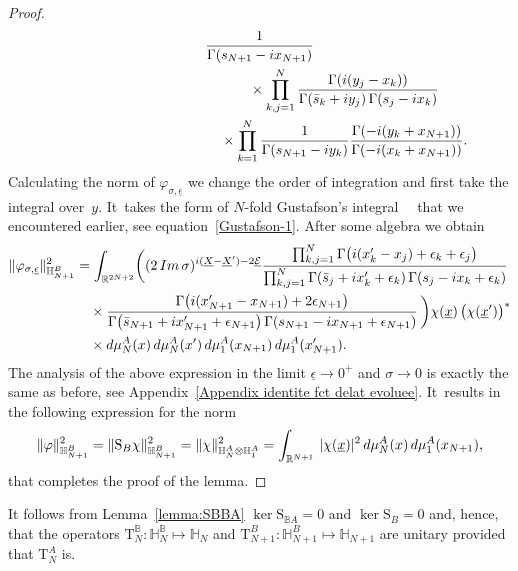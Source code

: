 \documentclass[11pt]{article}
\numberwithin{equation}{section}
\numberwithin{equation}{section}
\begin{document}
\begin{proof}
\begin{gather*}
\frac1{\Gamma(s_{N+1}-{\rm i}x_{N+1})}
\\ \hphantom{\big(\Psi^N_{p,\underline y},\Phi^N_{{\sigma,x}}\otimes\Phi^1_{\sigma,x_{N+1}}\big)_{\mathbb H_N} =}
{}\times \prod_{k,j=1}^N\frac{\Gamma({\rm i}(y_j-x_k)
)}{\Gamma(\bar s_k+{\rm i}y_j)\,\Gamma(s_j-{\rm i}x_k)}
\\ \hphantom{\big(\Psi^N_{p,\underline y},\Phi^N_{{\sigma,x}}\otimes\Phi^1_{\sigma,x_{N+1}}\big)_{\mathbb H_N} =}
{}\times \prod_{k=1}^N\frac1{\Gamma(s_{N+1}-{\rm i}y_k)} \frac{ \Gamma(-{\rm i}(y_k+x_{N+1}) )}{\Gamma(-{\rm i}(x_k+x_{N+1}))}.
\end{gather*}
Calculating the norm of $\varphi_{\sigma,\underline \epsilon}$ we change the order of integration and first take the integral over~$y$. It~takes the form of $N$-fold Gustafson's integral~~\cite[Theorem 5.1]{MR1139492} that we encountered earlier, see equation~\eqref{Gustafson-1}.
After some algebra we obtain
\begin{align*}
\|\varphi_{\sigma,\underline \epsilon}\|^2_{\mathbb H_{N+1}^B} & = \int_{\mathbb R^{2N+2}}
\biggl((2\mathop{\rm Im}\sigma)^{{\rm i}(\underline X-\underline X')-2\underline{\mathcal E}}
\frac{\prod_{k,j=1}^{N} \Gamma\big({\rm i}(x'_k-x_j)+\epsilon_k+\epsilon_j\big)}{\prod_{k,j=1}^{N}
\Gamma( \bar s_j+{\rm i}x'_k+\epsilon_k)\,\Gamma( s_j-{\rm i}x_k+\epsilon_k)}
\\
&\quad
\times \frac{\Gamma\big({\rm i}(x'_{N+1}-x_{N+1})+2\epsilon_{N+1}\big)}{
\Gamma\big(\bar s_{N+1}+{\rm i}x'_{N+1}+\epsilon_{N+1}\big)\,\Gamma( s_{N+1}-{\rm i}x_{N+1}+\epsilon_{N+1})}\,\biggr)\chi(\underline x)\, \big(\chi(\underline x')\big)^*
\\
&\quad \times {\rm d}\mu_{N}^A(x)\,{\rm d}\mu_{N}^A(x')\, {\rm d}\mu_{1}^A(x_{N+1})\,{\rm d}\mu_{1}^A(x'_{N+1}).
\end{align*}
The analysis of the above expression in the limit $\underline \epsilon\to 0^+$ and $\sigma \to0$ is exactly the same as before, see
Appendix~\ref{Appendix identite fct delat evoluee}. It~results in the following expression for the norm
\begin{gather*}
\|\varphi\|^2_{\mathbb H_{N+1}^B} =\|\mathrm S_B\chi\|^2_{\mathbb H_{N+1}^B} =\|\chi\|^2_{\mathbb H_{N}^A\otimes \mathbb H_1^A}
=\int_{\mathbb R^{N+1}}\, |\chi(\underline x)|^2\,{\rm d}\mu_{N}^A(x)\, {\rm d}\mu_{1}^A(x_{N+1}),
\end{gather*}
that completes the proof of the lemma.
\end{proof}


It follows from Lemma~\ref{lemma:SBBA} $\ker \mathrm S_{\mathbb BA}=0$ and $\ker \mathrm S_B=0$ and, hence, that the operators $\mathrm
T_{N}^{\mathbb B}\colon \mathbb H_{N}^{\mathbb B}\mapsto \mathbb H_{N}$ and $\mathrm T_{N+1}^B\colon \mathbb H_{N+1}^B\mapsto \mathbb H_{N+1}$ are
unitary provided that $\mathrm T_{N}^A$ is.
\end{document}
